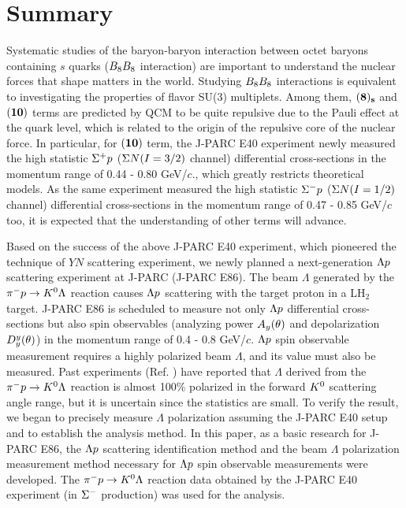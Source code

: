%
\graphicspath{{./pictures/chapter_summary/}}

\chapter{Summary} 
\label{chap-summary}
Systematic studies of the baryon-baryon interaction between octet baryons containing $s$ quarks ($B_{8}B_{8}$ interaction) are important to understand the nuclear forces that shape matters in the world. Studying $B_{8}B_{8}$ interactions is equivalent to investigating the properties of flavor SU(3) multiplets. Among them, ${\bf(8)_s}$ and ${\bf(10)}$ terms are predicted by QCM to be quite repulsive due to the Pauli effect at the quark level, which is related to the origin of the repulsive core of the nuclear force. In particular, for ${\bf(10)}$ term, the J-PARC E40 experiment newly measured the high statistic $\Sigma^{+}p$ ($\Sigma N (I=3/2)$ channel) differential cross-sections in the momentum range of 0.44 - 0.80 GeV/$c$., which greatly restricts theoretical models. As the same experiment measured the high statistic $\Sigma^{-}p$ ($\Sigma N (I=1/2)$ channel) differential cross-sections in the momentum range of 0.47 - 0.85 GeV/$c$ too, it is expected that the understanding of other terms will advance.

Based on the success of the above J-PARC E40 experiment, which pioneered the technique of $YN$ scattering experiment, we newly planned a next-generation $\Lambda p$ scattering experiment at J-PARC (J-PARC E86). The beam $\Lambda$ generated by the $\pi^- p \to K^0 \Lambda$ reaction causes $\Lambda p$ scattering with the target proton in a LH$_{2}$ target. J-PARC E86 is scheduled to measure not only $\Lambda p$ differential cross-sections but also spin observables (analyzing power $A_{y}(\theta)$ and depolarization $D^{y}_{y}(\theta)$) in the momentum range of 0.4 - 0.8 GeV/$c$. $\Lambda p$ spin observable measurement requires a highly polarized beam $\Lambda$, and its value must also be measured. Past experiments (Ref. \cite{Baker}) have reported that $\Lambda$ derived from the $\pi^- p \to K^0 \Lambda$ reaction is almost 100\% polarized in the forward $K^{0}$ scattering angle range, but it is uncertain since the statistics are small. To verify the result, we began to precisely measure $\Lambda$ polarization assuming the J-PARC E40 setup and to establish the analysis method. In this paper, as a basic research for J-PARC E86, the $\Lambda p$ scattering identification method and the beam $\Lambda$ polarization measurement method necessary for $\Lambda p$ spin observable measurements were developed. The $\pi^- p \to K^0 \Lambda$ reaction data obtained by the J-PARC E40 experiment (in $\Sigma^{-}$ production) was used for the analysis.

